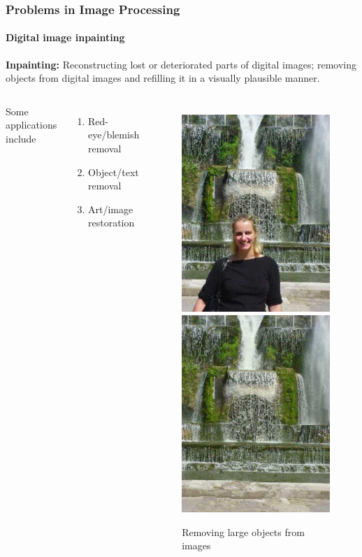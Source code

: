 \documentclass{beamer}
\begin{document}
\begin{frame}
\frametitle{Problems in Image Processing}
\framesubtitle{Digital image inpainting}

\textbf{Inpainting:} Reconstructing lost or deteriorated parts of digital images; removing objects from 
digital images and refilling it in a visually plausible manner.

\begin{columns}[c] %
Some applications include
\begin{enumerate}
	\item Red-eye/blemish removal
	\item Object/text removal
	\item Art/image restoration
\end{enumerate}
\begin{figure} %
\centering
	\includegraphics[width=0.45\columnwidth]{../figures/researchmicros-000.jpg}
	\hfill
	\includegraphics[width=0.45\columnwidth]{../figures/researchmicros-001.jpg}
\caption{Removing large objects from images}
\end{figure}
\end{columns}

\end{frame}
\end{document}
